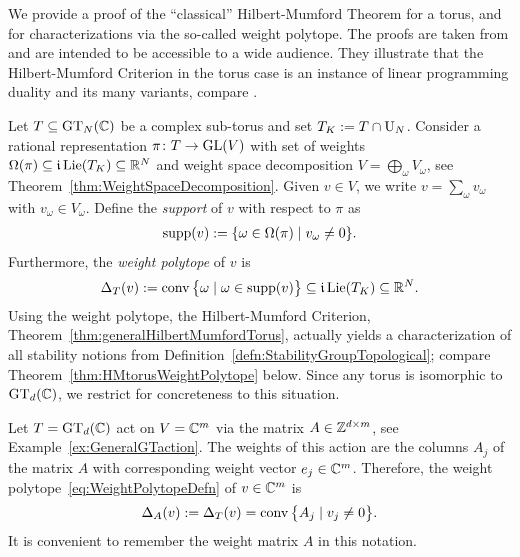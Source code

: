 We provide a proof of the ``classical'' Hilbert-Mumford Theorem for a torus, and for characterizations via the so-called weight polytope. The proofs are taken from \cite[Appendix~A]{DiscretePaper} and are intended to be accessible to a wide audience. They illustrate that the Hilbert-Mumford Criterion in the torus case is an instance of linear programming duality and its many variants, compare \cite[Chapter~7]{SchrijverBook}. 

Let $T \subseteq \operatorname{GT}_N(\mathbb C)$ be a complex sub-torus and set $T_K := T \cap \operatorname{U}_N$. Consider a rational representation $\pi \colon T \to \operatorname{GL}(V)$ with set of weights $\Omega(\pi) \subseteq \mathfrak{i} \operatorname{Lie}(T_K) \subseteq \mathbb R^N$ and weight space decomposition $V = \bigoplus_\omega V_\omega$, see Theorem~\ref{thm:WeightSpaceDecomposition}. 
Given $v \in V$, we write $v = \sum_{\omega} v_\omega$ with $v_\omega \in V_\omega$. Define the \emph{support} of $v$ with respect to $\pi$ as
\begin{align*}
	\operatorname{supp}(v) := \lbrace \omega \in \Omega(\pi) \mid v_\omega \neq 0 \rbrace.
\end{align*}
Furthermore, the \emph{weight polytope} of $v$ is
\begin{equation}\label{eq:WeightPolytopeDefn}
	\Delta_{T}(v) := \operatorname{conv} \big\{ \omega \mid \omega \in \operatorname{supp}(v) \big\} \subseteq \mathfrak{i} \operatorname{Lie}(T_K) \subseteq \mathbb R^N.
\end{equation}
Using the weight polytope, the Hilbert-Mumford Criterion, Theorem~\ref{thm:generalHilbertMumfordTorus}, actually yields a characterization of all stability notions from Definition~\ref{defn:StabilityGroupTopological}; compare Theorem~\ref{thm:HMtorusWeightPolytope} below. Since any torus is isomorphic to $\operatorname{GT}_d(\mathbb C)$, we restrict for concreteness to this situation.

Let $T = \operatorname{GT}_d(\mathbb C)$ act on $V = \mathbb C^m$ via the matrix $A \in \mathbb Z^{d \times m}$, see Example~\ref{ex:GeneralGTaction}. The weights of this action are the columns $A_j$ of the matrix $A$ with corresponding weight vector $e_j \in \mathbb C^m$. Therefore, the weight polytope~\eqref{eq:WeightPolytopeDefn} of $v \in \mathbb C^m$ is
	\[ \Delta_A(v) := \Delta_T(v) =  \operatorname{conv} \big\{ A_j \mid v_j \neq 0 \big\} .\]
It is convenient to remember the weight matrix $A$ in this notation.

